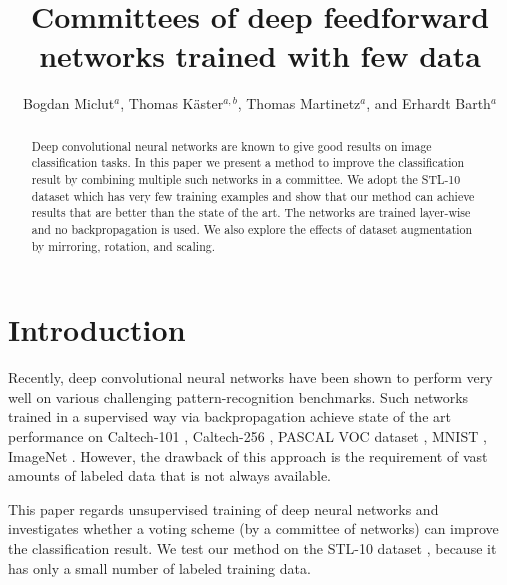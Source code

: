 \documentclass[runningheads]{llncs}
\begin{document}
\pagestyle{headings}
\mainmatter



\title{Committees of deep feedforward networks trained with few data}



\author{Bogdan Miclut$^{a}$, Thomas K\"aster$^{a, b}$, Thomas Martinetz$^{a}$, and Erhardt Barth$^{a}$
} 


\maketitle

\begin{abstract}
Deep convolutional neural networks are known to give good results on image classification tasks. In this paper we present a method to improve the classification result by combining multiple such networks in a committee. We adopt the STL-10 dataset which has very few training examples and show that our method can achieve results that are better than the state of the art. The networks are trained layer-wise and no backpropagation is used. We also explore the effects of dataset augmentation by mirroring, rotation, and scaling.
\end{abstract}



\section{Introduction}

Recently, deep convolutional neural networks have been shown to perform very well on various challenging pattern-recognition benchmarks. Such networks trained in a supervised way via backpropagation achieve state of the art performance on Caltech-101 \cite{CalTech101}, Caltech-256 \cite{CalTech101}, PASCAL VOC dataset \cite{Everingham10}, MNIST \cite{lecun-98}, ImageNet \cite{imagenet_cvpr09}. However, the drawback of this approach is the requirement of vast amounts of labeled data that is not always available. 

This paper regards unsupervised training of deep neural networks and investigates whether a voting scheme (by a committee of networks) can improve the classification result. We test our method on the STL-10 dataset \cite{Coates_ananalysis}, because it has only a small number of labeled training data. 
\end{document}
